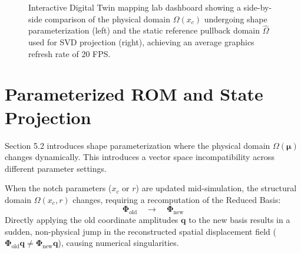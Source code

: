 \begin{figure}[htbp]
    \caption{Interactive Digital Twin mapping lab dashboard showing a side-by-side comparison of the physical domain $\Omega(x_c)$ undergoing shape parameterization (left) and the static reference pullback domain $\hat{\Omega}$ used for SVD projection (right), achieving an average graphics refresh rate of 20 FPS.}
    \label{fig:pullback_mapping_dt}
\end{figure}


\section{Parameterized ROM and State Projection} \label{sec:state_projection}
Section 5.2 introduces shape parameterization where the physical domain $\Omega(\boldsymbol{\mu})$ changes dynamically. This introduces a vector space incompatibility across different parameter settings. 

When the notch parameters ($x_c$ or $r$) are updated mid-simulation, the structural domain $\Omega(x_c, r)$ changes, requiring a recomputation of the Reduced Basis:
\begin{equation}
    \mathbf{\Phi}_{\text{old}} \quad \longrightarrow \quad \mathbf{\Phi}_{\text{new}}
\end{equation}
Directly applying the old coordinate amplitudes $\mathbf{q}$ to the new basis results in a sudden, non-physical jump in the reconstructed spatial displacement field ($\mathbf{\Phi}_{\text{old}} \mathbf{q} \neq \mathbf{\Phi}_{\text{new}} \mathbf{q}$), causing numerical singularities. 

